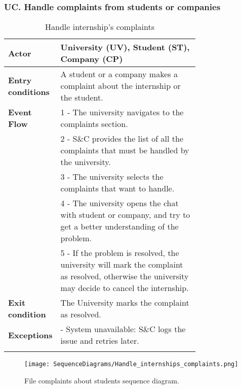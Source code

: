 \subsubsection*{UC\cuc . Handle complaints from students or companies}
\begin{center}
    \begin{longtable}{|l|p{0.75\linewidth}|}
        \hline
        \textbf{Actor}            & University (UV), Student (ST), Company (CP) \\
        \hline
        \textbf{Entry conditions} & A student or a company makes a complaint about the internship or the student. \\
        \hline
        \textbf{Event Flow}       & 1 - The university navigates to the complaints section. \\
        & 2 - S\&C provides the list of all the complaints that must be handled by the university. \\
        & 3 - The university selects the complaints that want to handle. \\
        & 4 - The university opens the chat with student or company, and try to get a better understanding of the problem. \\
        & 5 - If the problem is resolved, the university will mark the complaint as resolved, otherwise the university may decide to cancel the internship. \\
        \hline
        \textbf{Exit condition}   & The University marks the complaint as resolved. \\       
        \hline
        \textbf{Exceptions}       & - System unavailable: S\&C logs the issue and retries later. \\
        \hline
        \caption{Handle internship's complaints}
        \label{tab:handle_internships_complaints_usecase}
    \end{longtable}
\end{center}

\begin{figure}[H]
    \begin{center}
        \texttt{[image: SequenceDiagrams/Handle\_internships\_complaints.png]}
        \caption{File complaints about students sequence diagram.}
        \label{fig:handle_internships_complaints_seqd}%
    \end{center}
\end{figure}

